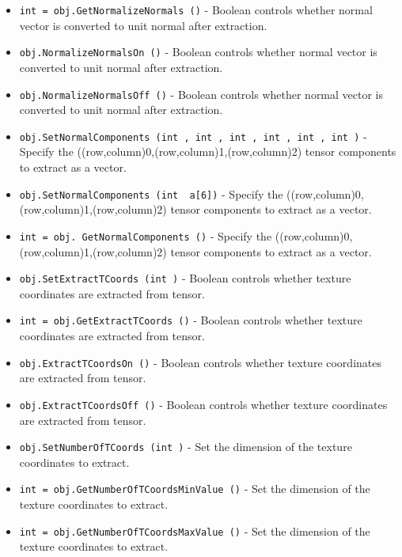 \begin{itemize}
\item  \verb|int = obj.GetNormalizeNormals ()| -  Boolean controls whether normal vector is converted to unit normal
 after extraction.

\item  \verb|obj.NormalizeNormalsOn ()| -  Boolean controls whether normal vector is converted to unit normal
 after extraction.

\item  \verb|obj.NormalizeNormalsOff ()| -  Boolean controls whether normal vector is converted to unit normal
 after extraction.

\item  \verb|obj.SetNormalComponents (int , int , int , int , int , int )| -  Specify the ((row,column)0,(row,column)1,(row,column)2) tensor
 components to extract as a vector.

\item  \verb|obj.SetNormalComponents (int  a[6])| -  Specify the ((row,column)0,(row,column)1,(row,column)2) tensor
 components to extract as a vector.

\item  \verb|int = obj. GetNormalComponents ()| -  Specify the ((row,column)0,(row,column)1,(row,column)2) tensor
 components to extract as a vector.

\item  \verb|obj.SetExtractTCoords (int )| -  Boolean controls whether texture coordinates are extracted from tensor.

\item  \verb|int = obj.GetExtractTCoords ()| -  Boolean controls whether texture coordinates are extracted from tensor.

\item  \verb|obj.ExtractTCoordsOn ()| -  Boolean controls whether texture coordinates are extracted from tensor.

\item  \verb|obj.ExtractTCoordsOff ()| -  Boolean controls whether texture coordinates are extracted from tensor.

\item  \verb|obj.SetNumberOfTCoords (int )| -  Set the dimension of the texture coordinates to extract.

\item  \verb|int = obj.GetNumberOfTCoordsMinValue ()| -  Set the dimension of the texture coordinates to extract.

\item  \verb|int = obj.GetNumberOfTCoordsMaxValue ()| -  Set the dimension of the texture coordinates to extract.


\end{itemize}
